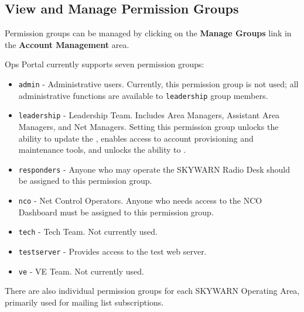 \documentclass[pdflatex,letterpaper,twoside,12pt]{book}
\begin{document}

\subsection{View and Manage Permission Groups}\label{ops-manage-groups}

Permission groups can be managed by clicking on the \textbf{Manage Groups} link in the \textbf{Account Management} area.

Ops Portal currently supports seven permission groups:

\begin{itemize}
\item \verb|admin| - Administrative users.  Currently, this permission group is not used;  all administrative functions are available to \verb|leadership| group members.
\item \verb|leadership| - Leadership Team.  Includes Area Managers, Assistant Area Managers, and Net Managers.  Setting this permission group unlocks the ability to update the , enables access to account provisioning and maintenance tools, and unlocks the ability to .
\item \verb|responders| - Anyone who may operate the SKYWARN Radio Desk should be assigned to this permission group.
\item \verb|nco| - Net Control Operators.  Anyone who needs access to the NCO Dashboard must be assigned to this permission group.
\item \verb|tech| - Tech Team.  Not currently used.
\item \verb|testserver| - Provides access to the test web server.
\item \verb|ve| - VE Team.  Not currently used.
\end{itemize}

There are also individual permission groups for each SKYWARN Operating Area, primarily used for mailing list subscriptions.
\end{document}
